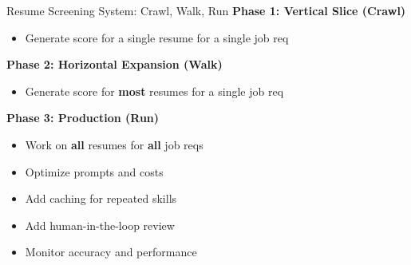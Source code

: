 \documentclass[aspectratio=169]{beamer}
\begin{document}
\begin{frame}{Resume Screening System: Crawl, Walk, Run}
\textbf{Phase 1: Vertical Slice (Crawl)}
\begin{itemize}
\item Generate score for a single resume for a single job req
\end{itemize}
\vspace{0.3cm}
\textbf{Phase 2: Horizontal Expansion (Walk)}
\begin{itemize}
\item Generate score for \textbf{most} resumes for a single job req
\end{itemize}
\vspace{0.3cm}
\textbf{Phase 3: Production (Run)}
\begin{itemize}
	\item Work on \textbf{all} resumes for \textbf{all} job reqs
    \item Optimize prompts and costs
    \item Add caching for repeated skills
    \item Add human-in-the-loop review
    \item Monitor accuracy and performance
\end{itemize}
\end{frame}
\end{document}
